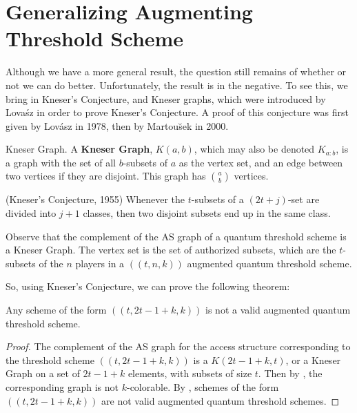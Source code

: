 \label{ch:4}


\section{Generalizing Augmenting Threshold Scheme}

Although we have a more general result, the question still remains of whether or not we can do better. Unfortunately, the result is in the negative. To see this, we bring in Kneser's Conjecture, and Kneser graphs, which were introduced by Lova\'{s}z in order to prove Kneser's Conjecture. A proof of this conjecture was first given by Lov\'asz in 1978, then by Martou\u{s}ek in 2000.

\begin{definition}{Kneser Graph.}
    \label{defn:kneser-graph}
    A \textbf{Kneser Graph}, $K(a,b)$, which may also be denoted $K_{a:b}$, is a graph with the set of all $b$-subsets of $a$ as the vertex set, and an edge between two vertices if they are disjoint. This graph has $\binom{a}{b}$ vertices.  
\end{definition}

\begin{theorem}
    \label{thm:kneser-conjecture}
    (Kneser's Conjecture, 1955) Whenever the $t$-subsets of a $(2t+j)$-set are divided into $j+1$ classes, then two disjoint subsets end up in the same class. 
\end{theorem}

\begin{remark}
    Observe that the complement of the AS graph of a quantum threshold scheme is a Kneser Graph. The vertex set is the set of authorized subsets, which are the $t$-subsets of the $n$ players in a $((t,n,k))$ augmented quantum threshold scheme.
\end{remark}

So, using Kneser's Conjecture, we can prove the following theorem:

\begin{theorem}
    \label{thm:no-more} 
    Any scheme of the form $((t,2t-1+k,k))$ is not a valid augmented quantum threshold scheme.
\end{theorem}

\begin{proof}
    The complement of the AS graph for the access structure corresponding to the threshold scheme $((t,2t-1+k,k))$ is a $K(2t-1+k,t)$, or a Kneser Graph on a set of $2t-1+k$ elements, with subsets of size $t$. Then by , the corresponding graph is not $k$-colorable. By , schemes of the form $((t,2t-1+k,k))$ are not valid augmented quantum threshold schemes.
\end{proof}

